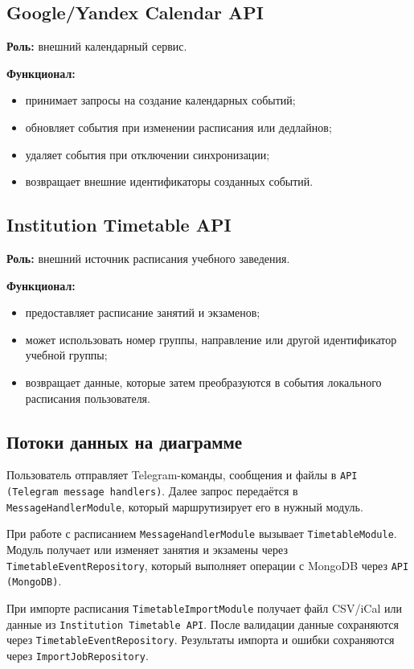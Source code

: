 \documentclass[10pt,a4paper,final]{article} %
\begin{document}
\subsection{Google/Yandex Calendar API}

\textbf{Роль:} внешний календарный сервис.

\textbf{Функционал:}
\begin{itemize}
    \item принимает запросы на создание календарных событий;
    \item обновляет события при изменении расписания или дедлайнов;
    \item удаляет события при отключении синхронизации;
    \item возвращает внешние идентификаторы созданных событий.
\end{itemize}

\subsection{Institution Timetable API}

\textbf{Роль:} внешний источник расписания учебного заведения.

\textbf{Функционал:}
\begin{itemize}
    \item предоставляет расписание занятий и экзаменов;
    \item может использовать номер группы, направление или другой идентификатор
    учебной группы;
    \item возвращает данные, которые затем преобразуются в события локального
    расписания пользователя.
\end{itemize}

\subsection{Потоки данных на диаграмме}

Пользователь отправляет Telegram-команды, сообщения и файлы в
\texttt{API (Telegram message handlers)}. Далее запрос передаётся в
\texttt{MessageHandlerModule}, который маршрутизирует его в нужный модуль.

При работе с расписанием \texttt{MessageHandlerModule} вызывает
\texttt{TimetableModule}. Модуль получает или изменяет занятия и экзамены
через \texttt{TimetableEventRepository}, который выполняет операции с MongoDB
через \texttt{API (MongoDB)}.

При импорте расписания \texttt{TimetableImportModule} получает файл CSV/iCal
или данные из \texttt{Institution Timetable API}. После валидации данные
сохраняются через \texttt{TimetableEventRepository}. Результаты импорта и
ошибки сохраняются через \texttt{ImportJobRepository}.
\end{document}
